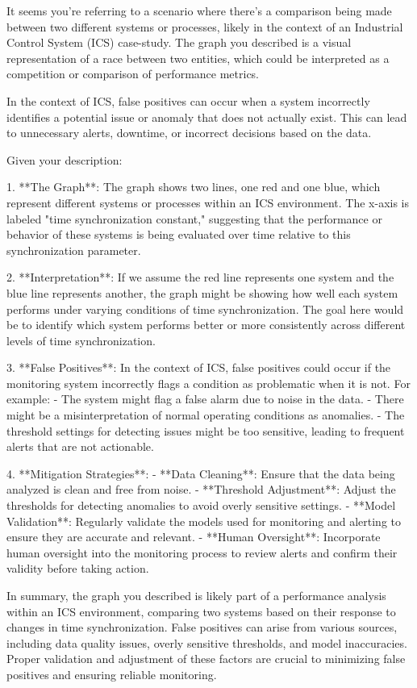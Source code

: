 It seems you're referring to a scenario where there's a comparison being made between two different systems or processes, likely in the context of an Industrial Control System (ICS) case-study. The graph you described is a visual representation of a race between two entities, which could be interpreted as a competition or comparison of performance metrics.

In the context of ICS, false positives can occur when a system incorrectly identifies a potential issue or anomaly that does not actually exist. This can lead to unnecessary alerts, downtime, or incorrect decisions based on the data.

Given your description:

1. **The Graph**: The graph shows two lines, one red and one blue, which represent different systems or processes within an ICS environment. The x-axis is labeled "time synchronization constant," suggesting that the performance or behavior of these systems is being evaluated over time relative to this synchronization parameter.

2. **Interpretation**: If we assume the red line represents one system and the blue line represents another, the graph might be showing how well each system performs under varying conditions of time synchronization. The goal here would be to identify which system performs better or more consistently across different levels of time synchronization.

3. **False Positives**: In the context of ICS, false positives could occur if the monitoring system incorrectly flags a condition as problematic when it is not. For example:
   - The system might flag a false alarm due to noise in the data.
   - There might be a misinterpretation of normal operating conditions as anomalies.
   - The threshold settings for detecting issues might be too sensitive, leading to frequent alerts that are not actionable.

4. **Mitigation Strategies**:
   - **Data Cleaning**: Ensure that the data being analyzed is clean and free from noise.
   - **Threshold Adjustment**: Adjust the thresholds for detecting anomalies to avoid overly sensitive settings.
   - **Model Validation**: Regularly validate the models used for monitoring and alerting to ensure they are accurate and relevant.
   - **Human Oversight**: Incorporate human oversight into the monitoring process to review alerts and confirm their validity before taking action.

In summary, the graph you described is likely part of a performance analysis within an ICS environment, comparing two systems based on their response to changes in time synchronization. False positives can arise from various sources, including data quality issues, overly sensitive thresholds, and model inaccuracies. Proper validation and adjustment of these factors are crucial to minimizing false positives and ensuring reliable monitoring.